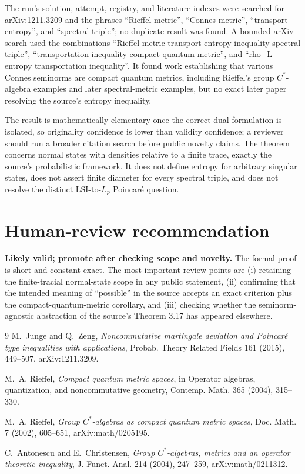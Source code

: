 \documentclass[11pt]{article}
\begin{document}
The run's solution, attempt, registry, and literature indexes were searched for
arXiv:1211.3209 and the phrases ``Rieffel metric'', ``Connes metric'',
``transport entropy'', and ``spectral triple''; no duplicate result was found.
A bounded arXiv search used the combinations ``Rieffel metric transport
entropy inequality spectral triple'', ``transportation inequality compact
quantum metric'', and ``rho\_L entropy transportation inequality''.  It found
work establishing that various Connes seminorms are compact quantum metrics,
including Rieffel's group $C^*$-algebra examples and later spectral-metric
examples, but no exact later paper resolving the source's entropy inequality.

The result is mathematically elementary once the correct dual formulation is
isolated, so originality confidence is lower than validity confidence; a
reviewer should run a broader citation search before public novelty claims.
The theorem concerns normal states with densities relative to a finite trace,
exactly the source's probabilistic framework.  It does not define entropy for
arbitrary singular states, does not assert finite diameter for every spectral
triple, and does not resolve the distinct LSI-to-$L_p$ Poincar\'e question.

\section*{Human-review recommendation}

\textbf{Likely valid; promote after checking scope and novelty.}  The formal
proof is short and constant-exact.  The most important review points are
(i) retaining the finite-tracial normal-state scope in any public statement,
(ii) confirming that the intended meaning of ``possible'' in the source
accepts an exact criterion plus the compact-quantum-metric corollary, and
(iii) checking whether the seminorm-agnostic abstraction of the source's
Theorem 3.17 has appeared elsewhere.

\begin{thebibliography}{9}
M.~Junge and Q.~Zeng,
\emph{Noncommutative martingale deviation and Poincar\'e type inequalities
with applications}, Probab. Theory Related Fields 161 (2015), 449--507,
arXiv:1211.3209.

M.~A. Rieffel,
\emph{Compact quantum metric spaces}, in Operator algebras, quantization, and
noncommutative geometry, Contemp. Math. 365 (2004), 315--330.

M.~A. Rieffel,
\emph{Group $C^*$-algebras as compact quantum metric spaces},
Doc. Math. 7 (2002), 605--651, arXiv:math/0205195.

C.~Antonescu and E.~Christensen,
\emph{Group $C^*$-algebras, metrics and an operator theoretic inequality},
J. Funct. Anal. 214 (2004), 247--259, arXiv:math/0211312.
\end{thebibliography}
\end{document}
